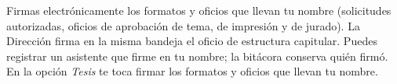 \documentclass[11pt,a4paper]{article}
\begin{document}
{\small\tableofcontents}
\newpage
\begin{quevasahacer}
Firmas electrónicamente los formatos y oficios que llevan tu nombre (solicitudes autorizadas, oficios de aprobación de tema, de impresión y de jurado). La Dirección firma en la misma bandeja el oficio de estructura capitular. Puedes registrar un asistente que firme en tu nombre; la bitácora conserva quién firmó. En la opción \emph{Tesis} te toca firmar los formatos y oficios que llevan tu nombre.
\end{quevasahacer}



\end{document}
